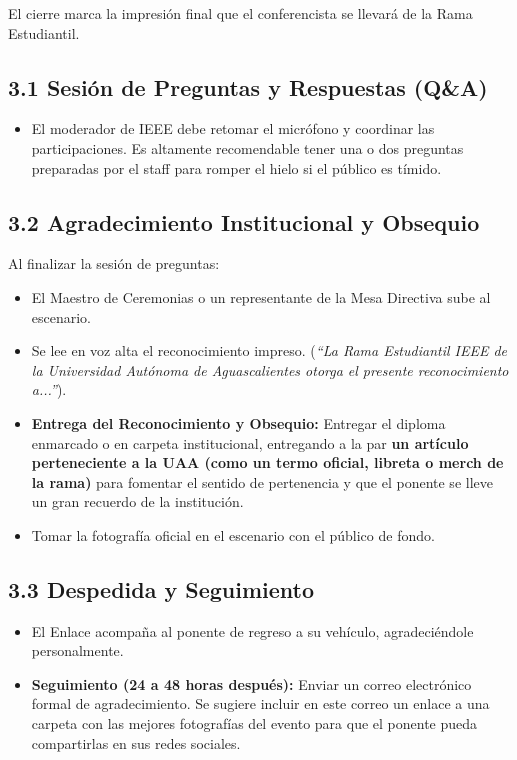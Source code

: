 \documentclass[11pt,a4paper]{article}
\begin{document}
El cierre marca la impresión final que el conferencista se llevará de la Rama Estudiantil.

\subsection{3.1 Sesión de Preguntas y Respuestas (Q\&A)}
\begin{itemize}
    \item El moderador de IEEE debe retomar el micrófono y coordinar las participaciones. Es altamente recomendable tener una o dos preguntas preparadas por el staff para romper el hielo si el público es tímido.
\end{itemize}

\subsection{3.2 Agradecimiento Institucional y Obsequio}
Al finalizar la sesión de preguntas:
\begin{itemize}
    \item El Maestro de Ceremonias o un representante de la Mesa Directiva sube al escenario.
    \item Se lee en voz alta el reconocimiento impreso. (\textit{``La Rama Estudiantil IEEE de la Universidad Autónoma de Aguascalientes otorga el presente reconocimiento a...''}).
    \item \textbf{Entrega del Reconocimiento y Obsequio:} Entregar el diploma enmarcado o en carpeta institucional, entregando a la par \textbf{un artículo perteneciente a la UAA (como un termo oficial, libreta o merch de la rama)} para fomentar el sentido de pertenencia y que el ponente se lleve un gran recuerdo de la institución.
    \item Tomar la fotografía oficial en el escenario con el público de fondo.
\end{itemize}

\subsection{3.3 Despedida y Seguimiento}
\begin{itemize}
    \item El Enlace acompaña al ponente de regreso a su vehículo, agradeciéndole personalmente.
    \item \textbf{Seguimiento (24 a 48 horas después):} Enviar un correo electrónico formal de agradecimiento. Se sugiere incluir en este correo un enlace a una carpeta con las mejores fotografías del evento para que el ponente pueda compartirlas en sus redes sociales.
\end{itemize}
\end{document}
